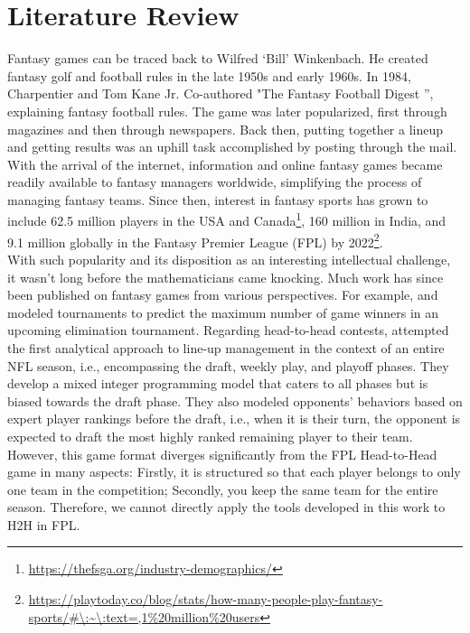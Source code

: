		\chapter{Literature Review}
			Fantasy games can be traced back to Wilfred ‘Bill’ Winkenbach. He created fantasy golf and football rules in the late 1950s and early 1960s. In 1984, Charpentier and Tom Kane Jr. Co-authored "The Fantasy Football Digest '', explaining fantasy football rules. The game was later popularized, first through magazines and then through newspapers.  Back then, putting together a lineup and getting results was an uphill task accomplished by posting through the mail. With the arrival of the internet, information and online fantasy games became readily available to fantasy managers worldwide, simplifying the process of managing fantasy teams. Since then, interest in fantasy sports has grown to include 62.5 million players in the USA and Canada\footnote{\url{https://thefsga.org/industry-demographics/}}, 160 million in India, and 9.1 million globally in the Fantasy Premier League (FPL) by 2022\footnote{\url{https://playtoday.co/blog/stats/how-many-people-play-fantasy-sports/\#\:\~\:text=,1\%20million\%20users}}.
			\\
			With such popularity and its disposition as an interesting intellectual challenge, it wasn’t long before the mathematicians came knocking. Much work has since been published on fantasy games from various perspectives. For example, \cite{Kaplan_Garstka_2001}  and \citet{Clair_Letscher_2007} modeled tournaments to predict the maximum number of game winners in an upcoming elimination tournament. Regarding head-to-head contests, \cite{becker2016analytical} attempted the first analytical approach to line-up management in the context of an entire NFL season, i.e., encompassing the draft, weekly play, and playoff phases. They develop a mixed integer programming model that caters to all phases but is biased towards the draft phase. They also modeled opponents' behaviors based on expert player rankings before the draft, i.e., when it is their turn, the opponent is expected to draft the most highly ranked remaining player to their team. However, this game format diverges significantly from the FPL Head-to-Head game in many aspects: Firstly, it is structured so that each player belongs to only one team in the competition; Secondly, you keep the same team for the entire season. Therefore, we cannot directly apply the tools developed in this work to H2H in FPL.
			\\
